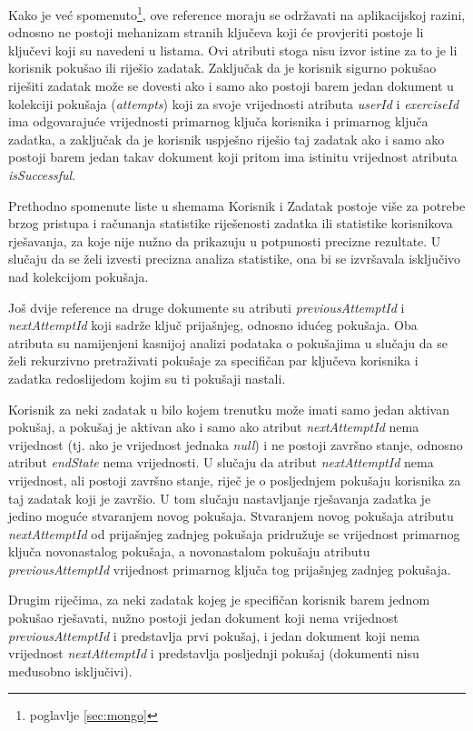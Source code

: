 \documentclass[times, utf8, diplomski, numeric]{fer}
\newcommand{\razmakp}{\vspace{18pt}}
\begin{document}
Kako je već spomenuto\footnote{poglavlje \ref{sec:mongo}}, ove reference moraju se održavati na aplikacijskoj razini, odnosno ne postoji mehanizam stranih ključeva koji će provjeriti postoje li ključevi koji su navedeni u listama.
Ovi atributi stoga nisu izvor istine  za to je li korisnik pokušao ili riješio zadatak.
Zaključak da je korisnik sigurno pokušao riješiti zadatak može se dovesti ako i samo ako postoji barem jedan dokument u kolekciji pokušaja (\emph{attempts}) koji za svoje vrijednosti atributa \emph{userId} i \emph{exerciseId} ima odgovarajuće vrijednosti primarnog ključa korisnika i primarnog ključa zadatka, a zaključak da je korisnik uspješno riješio taj zadatak ako i samo ako postoji barem jedan takav dokument koji pritom ima istinitu vrijednost atributa \emph{isSuccessful}.

Prethodno spomenute liste u shemama Korisnik i Zadatak postoje više za potrebe brzog pristupa i računanja statistike riješenosti zadatka ili statistike korisnikova rješavanja, za koje nije nužno da prikazuju u potpunosti precizne rezultate.
U slučaju da se želi izvesti precizna analiza statistike, ona bi se izvršavala isključivo nad kolekcijom pokušaja.

\razmakp

Još dvije reference na druge dokumente su atributi \emph{previousAttemptId} i \emph{nextAttemptId} koji sadrže ključ prijašnjeg, odnosno idućeg pokušaja.
Oba atributa su namijenjeni kasnijoj analizi podataka o pokušajima u slučaju da se želi rekurzivno pretraživati pokušaje za specifičan par ključeva korisnika i zadatka redoslijedom kojim su ti pokušaji nastali.

Korisnik za neki zadatak u bilo kojem trenutku može imati samo jedan aktivan pokušaj, a pokušaj je aktivan ako i samo ako atribut \emph{nextAttemptId} nema vrijednost (tj. ako je vrijednost jednaka \emph{null}) i ne postoji završno stanje, odnosno atribut \emph{endState} nema vrijednosti.
U slučaju da atribut \emph{nextAttemptId} nema vrijednost, ali postoji završno stanje, riječ je o posljednjem pokušaju korisnika za taj zadatak koji je završio.
U tom slučaju nastavljanje rješavanja zadatka je jedino moguće stvaranjem novog pokušaja.
Stvaranjem novog pokušaja atributu \emph{nextAttemptId} od prijašnjeg zadnjeg pokušaja pridružuje se vrijednost primarnog ključa novonastalog pokušaja, a novonastalom pokušaju atributu \emph{previousAttemptId} vrijednost primarnog ključa tog prijašnjeg zadnjeg pokušaja.

Drugim riječima, za neki zadatak kojeg je specifičan korisnik barem jednom pokušao rješavati, nužno postoji jedan dokument koji nema vrijednost \emph{previousAttemptId} i predstavlja prvi pokušaj, i jedan dokument koji nema vrijednost \emph{nextAttemptId} i predstavlja posljednji pokušaj (dokumenti nisu međusobno isključivi).
\end{document}
